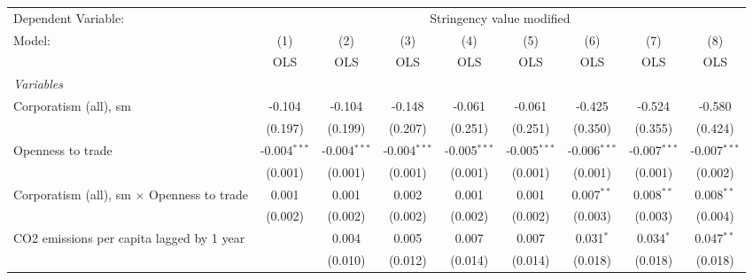 
\begingroup
\centering
\begin{tabular}{lcccccccc}
   \toprule
   Dependent Variable: & \multicolumn{8}{c}{Stringency value modified}\\
   Model:                                                    & (1)            & (2)            & (3)            & (4)            & (5)            & (6)            & (7)            & (8)\\  
                                                             &  OLS           & OLS            & OLS            & OLS            & OLS            & OLS            & OLS            & OLS\\  
   \midrule
   \emph{Variables}\\
   Corporatism (all), sm                                     & -0.104         & -0.104         & -0.148         & -0.061         & -0.061         & -0.425         & -0.524         & -0.580\\   
                                                             & (0.197)        & (0.199)        & (0.207)        & (0.251)        & (0.251)        & (0.350)        & (0.355)        & (0.424)\\   
   Openness to trade                                         & -0.004$^{***}$ & -0.004$^{***}$ & -0.004$^{***}$ & -0.005$^{***}$ & -0.005$^{***}$ & -0.006$^{***}$ & -0.007$^{***}$ & -0.007$^{***}$\\   
                                                             & (0.001)        & (0.001)        & (0.001)        & (0.001)        & (0.001)        & (0.001)        & (0.001)        & (0.002)\\   
   Corporatism (all), sm $\times$ Openness to trade          & 0.001          & 0.001          & 0.002          & 0.001          & 0.001          & 0.007$^{**}$   & 0.008$^{**}$   & 0.008$^{**}$\\   
                                                             & (0.002)        & (0.002)        & (0.002)        & (0.002)        & (0.002)        & (0.003)        & (0.003)        & (0.004)\\   
   CO2 emissions per capita lagged by 1 year                 &                & 0.004          & 0.005          & 0.007          & 0.007          & 0.031$^{*}$    & 0.034$^{*}$    & 0.047$^{**}$\\   
                                                             &                & (0.010)        & (0.012)        & (0.014)        & (0.014)        & (0.018)        & (0.018)        & (0.018)\\   

\end{tabular}
